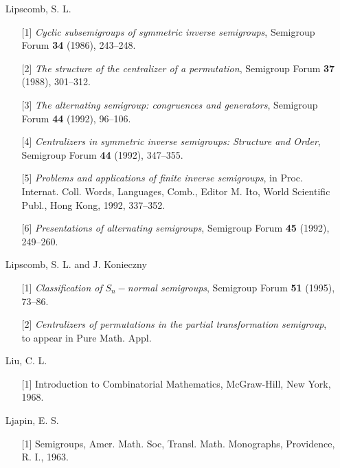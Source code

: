 \documentclass{surv-l}
\numberwithin{equation}{section}
\numberwithin{table}{section}
\numberwithin{figure}{section}
\theoremstyle{definition}
\begin{document}
\begin{enumerate}
\item[] Lipscomb, S. L.
\begin{enumerate}
\item[\hypertarget{bib43}{[1]}] \emph{Cyclic subsemigroups of symmetric inverse
semigroups}, Semigroup Forum \textbf{34} (1986), 243--248.

\item[\hypertarget{bib43a}{[2]}] \emph{The structure of
the centralizer of a permutation}, Semigroup Forum \textbf{37}
(1988), 301--312.

\item[\hypertarget{bib43b}{[3]}] \emph{The alternating semigroup: congruences and
generators}, Semigroup Forum \textbf{44} (1992), 96--106.

\item[\hypertarget{bib43c}{[4]}] \emph{Centralizers in symmetric inverse semigroups:
Structure and Order}, Semigroup Forum \textbf{44} (1992),
347--355.

\item[\hypertarget{bib43d}{[5]}] \emph{Problems and applications of finite inverse
semigroups}, in Proc. Internat. Coll. Words, Languages,
Comb., Editor M. Ito, World Scientific Publ., Hong Kong,
1992, 337--352.

\item[\hypertarget{bib43e}{[6]}] \emph{Presentations of alternating semigroups},
Semigroup Forum \textbf{45} (1992), 249--260.
\end{enumerate}

\item[] Lipscomb, S. L. and J. Konieczny
\begin{enumerate}
\item[\hypertarget{bib44}{[1]}] \emph{Classification of} $S_{n}-$\emph{normal
semigroups}, Semigroup Forum \textbf{51} (1995), 73--86.

\item[\hypertarget{bib44a}{[2]}] \emph{Centralizers of permutations in the partial
transformation semigroup}, to appear in Pure Math. Appl.
\end{enumerate}

\item[] Liu, C. L.
\begin{enumerate}
\item[\hypertarget{bib45}{[1]}] Introduction to Combinatorial Mathematics,
McGraw-Hill, New York, 1968.
\end{enumerate}

\item[] Ljapin, E. S.
\begin{enumerate}
\item[\hypertarget{bib46}{[1]}] Semigroups, Amer. Math. Soc, Transl. Math.
Monographs, Providence, R. I., 1963.
\end{enumerate}


\end{enumerate}
\end{document}
